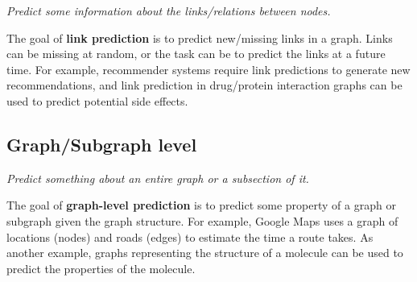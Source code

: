 \documentclass[12pt]{article}
\begin{document}
\textit{Predict some information about the links/relations between nodes.}

\medskip
The goal of \textbf{link prediction} is to predict new/missing links in a graph.
Links can be missing at random, or the task can be to predict the links at a
future time. For example, recommender systems require link predictions to
generate new recommendations, and link prediction in drug/protein interaction
graphs can be used to predict potential side effects.

\subsection*{Graph/Subgraph level}

\textit{Predict something about an entire graph or a subsection of it.}

\medskip
The goal of \textbf{graph-level prediction} is to predict some property of a
graph or subgraph given the graph structure. For example, Google Maps uses a
graph of locations (nodes) and roads (edges) to estimate the time a route takes.
As another example, graphs representing the structure of a molecule can be used
to predict the properties of the molecule.
\end{document}
